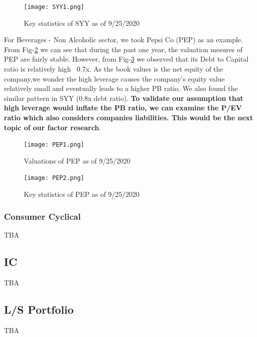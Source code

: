 \documentclass[11pt]{article} %
\begin{document}
\begin{figure}[H]
\centering
\texttt{[image: SYY1.png]}
\caption{Key statistics of SYY as of 9/25/2020}
\label{fig:syy1}
\end{figure}

For Beverages - Non Alcoholic sector, we took Pepsi Co (PEP) as an example. From Fig-\ref{fig:pep1} we can see that during the past one year, the valuation mesures of PEP are fairly stable. However, from Fig-\ref{fig:pep2} we observed that its Debt to Capital ratio is relatively high ~0.7x. As the book values is the net equity of the company,we wonder the high leverage causes the company's equity value relatively small and eventually leads to a higher PB ratio. We also found the similar pattern in SYY (0.8x debt ratio). \textbf{To validate our assumption that high leverage would inflate the PB ratio, we can examine the P/EV ratio which also considers companies liabilities. This would be the next topic of our factor research}.

\begin{figure}[H]
\centering
\texttt{[image: PEP1.png]}
\caption{Valuations of PEP as of 9/25/2020}
\label{fig:pep1}
\end{figure}

\begin{figure}[H]
\centering
\texttt{[image: PEP2.png]}
\caption{Key statistics of PEP as of 9/25/2020}
\label{fig:pep2}
\end{figure}


\subsubsection{Consumer Cyclical}
TBA

\subsection{IC}
TBA


\subsection{L/S Portfolio}
TBA
\end{document}
